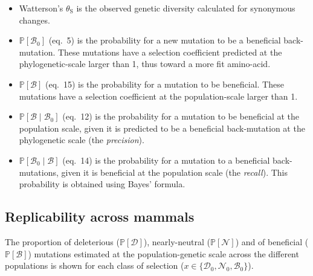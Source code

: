 \documentclass{article}
\newcommand{\proba}{\mathbb{P}}
\newcommand{\SphyDel}{\mathcal{D}_0}
\newcommand{\SphyNeu}{\mathcal{N}_0}
\newcommand{\SphyBen}{\mathcal{B}_0}
\newcommand{\Sphyclass}{x}
\newcommand{\given}{\mid}
\newcommand{\SpopDel}{\mathcal{D}}
\newcommand{\SpopNeu}{\mathcal{N}}
\newcommand{\SpopBen}{\mathcal{B}}
\newcommand{\ProbaPopDel}{\proba [ \SpopDel]}
\newcommand{\ProbaPopNeu}{\proba [ \SpopNeu ]}
\newcommand{\ProbaPopBen}{\proba [ \SpopBen ]}
\newcommand{\thetaSyn}{\theta_{\text{S}}}
\begin{document}
    \begin{itemize}
        \item Watterson's $\thetaSyn$ is the observed genetic diversity calculated for synonymous changes.
        \item $\proba [ \SphyBen ]$ (eq.~5) is the probability for a new mutation to be a beneficial back-mutation.
        These mutations have a selection coefficient predicted at the phylogenetic-scale larger than 1, thus toward a more fit amino-acid.
        \item $\proba [ \SpopBen ]$ (eq.~15) is the probability for a mutation to be beneficial.
        These mutations have a selection coefficient at the population-scale larger than 1.
        \item $\proba [ \SpopBen \given \SphyBen]$ (eq.~12) is the probability for a mutation to be beneficial at the population scale, given it is predicted to be a beneficial back-mutation at the phylogenetic scale (the \textit{precision}).
        \item $\proba [ \SphyBen \given \SpopBen]$ (eq.~14) is the probability for a mutation to a beneficial back-mutations, given it is beneficial at the population scale (the \textit{recall}).
        This probability is obtained using Bayes' formula.
    \end{itemize}
    \newpage

    \subsection{Replicability across mammals}
    The proportion of deleterious ($\ProbaPopDel$), nearly-neutral ($\ProbaPopNeu$) and of beneficial ($\ProbaPopBen$) mutations estimated at the population-genetic scale across the different populations is shown for each class of selection ($\Sphyclass \in \{\SphyDel, \SphyNeu, \SphyBen \}$).
\end{document}
